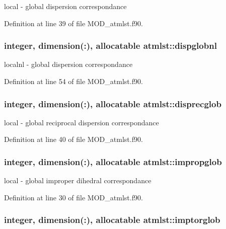 local -\/ global dispersion correspondance 



Definition at line 39 of file M\-O\-D\-\_\-atmlst.\-f90.

\hypertarget{classatmlst_a8f2f229104f82c885138a2f8afe9c761}{
\subsubsection[{dispglobnl}]{\setlength{\rightskip}{0pt plus 5cm}integer, dimension(\-:), allocatable atmlst\-::dispglobnl}}\label{classatmlst_a8f2f229104f82c885138a2f8afe9c761}


localnl -\/ global dispersion correspondance 



Definition at line 54 of file M\-O\-D\-\_\-atmlst.\-f90.

\hypertarget{classatmlst_accb07e02e31c6d75821dfd39b36b3f55}{
\subsubsection[{disprecglob}]{\setlength{\rightskip}{0pt plus 5cm}integer, dimension(\-:), allocatable atmlst\-::disprecglob}}\label{classatmlst_accb07e02e31c6d75821dfd39b36b3f55}


local -\/ global reciprocal dispersion correspondance 



Definition at line 40 of file M\-O\-D\-\_\-atmlst.\-f90.

\hypertarget{classatmlst_a7792a201a52700c101604e529b23a0d1}{
\subsubsection[{impropglob}]{\setlength{\rightskip}{0pt plus 5cm}integer, dimension(\-:), allocatable atmlst\-::impropglob}}\label{classatmlst_a7792a201a52700c101604e529b23a0d1}


local -\/ global improper dihedral correspondance 



Definition at line 30 of file M\-O\-D\-\_\-atmlst.\-f90.

\hypertarget{classatmlst_a12c060f14f9efccb685084b1143e93b2}{
\subsubsection[{imptorglob}]{\setlength{\rightskip}{0pt plus 5cm}integer, dimension(\-:), allocatable atmlst\-::imptorglob}}\label{classatmlst_a12c060f14f9efccb685084b1143e93b2}


